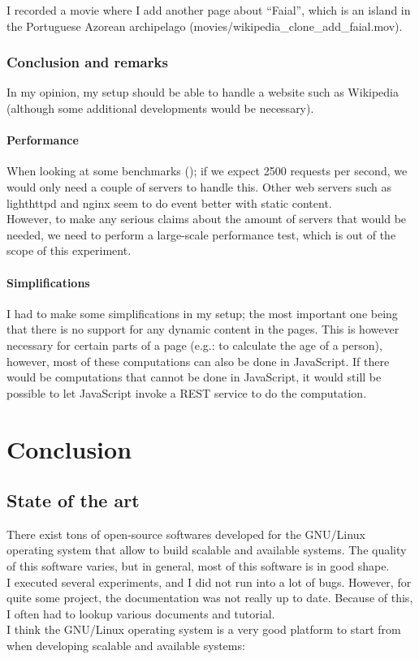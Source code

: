 \documentclass[12pt]{report}
\begin{document}
I recorded a movie where I add another page about ``Faial'', which is
an island in the Portuguese Azorean archipelago
(movies/wikipedia\_clone\_add\_faial.mov).

\subsection{Conclusion and remarks}
In my opinion, my setup should be able to handle a website such as
Wikipedia (although some additional developments would be
necessary). 
\subsubsection{Performance}
When looking at some benchmarks
(\cite{web_server_benchmarks}); if we expect 2500 requests per second,
we would only need a couple of servers to handle this. Other web
servers such as lighthttpd and nginx seem to do event better with
static content. \\
However, to make any serious claims about the amount of servers that
would be needed, we need to perform a large-scale performance test,
which is out of the scope of this experiment.
\subsubsection{Simplifications}
I had to make some simplifications in my setup; the most important one
being that there is no support for any dynamic content in the pages. This
is however necessary for certain parts of a page (e.g.: to
calculate the age of a person), however, most of these computations
can also be done in JavaScript. If there would be computations that
cannot be done in JavaScript, it would still be possible to let
JavaScript invoke a REST service to do the computation.   

\chapter{Conclusion} %
\section{State of the art}
There exist tons of open-source softwares developed for the GNU/Linux 
operating system that allow to build scalable and available systems.
The quality of this software varies, but in general, most of this
software is in good shape. \\
I executed several experiments, and I did not run into a lot of
bugs. However, for quite some project, the documentation was not
really up to date. Because of this, I often had to lookup various
documents and tutorial.\\
I think the GNU/Linux operating system is a very good platform to
start from when developing scalable and available systems: 
\end{document}
